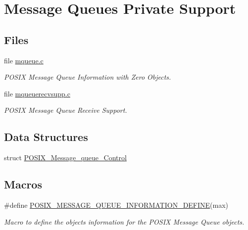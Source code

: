 \hypertarget{group__POSIX__MQUEUE__P}{}\section{Message Queues Private Support}
\label{group__POSIX__MQUEUE__P}
\subsection*{Files}
\begin{DoxyCompactItemize}
\item 
file \mbox{\hyperlink{mqueue_8c}{mqueue.\+c}}
\begin{DoxyCompactList}\small\item\em P\+O\+S\+IX Message Queue Information with Zero Objects. \end{DoxyCompactList}\item 
file \mbox{\hyperlink{mqueuerecvsupp_8c}{mqueuerecvsupp.\+c}}
\begin{DoxyCompactList}\small\item\em P\+O\+S\+IX Message Queue Receive Support. \end{DoxyCompactList}\end{DoxyCompactItemize}
\subsection*{Data Structures}
\begin{DoxyCompactItemize}
\item 
struct \mbox{\hyperlink{structPOSIX__Message__queue__Control}{P\+O\+S\+I\+X\+\_\+\+Message\+\_\+queue\+\_\+\+Control}}
\end{DoxyCompactItemize}
\subsection*{Macros}
\begin{DoxyCompactItemize}
\item 
\#define \mbox{\hyperlink{group__POSIX__MQUEUE__P_ga853d4305df0c19698101bde224806b25}{P\+O\+S\+I\+X\+\_\+\+M\+E\+S\+S\+A\+G\+E\+\_\+\+Q\+U\+E\+U\+E\+\_\+\+I\+N\+F\+O\+R\+M\+A\+T\+I\+O\+N\+\_\+\+D\+E\+F\+I\+NE}}(max)
\begin{DoxyCompactList}\small\item\em Macro to define the objects information for the P\+O\+S\+IX Message Queue objects. \end{DoxyCompactList}\end{DoxyCompactItemize}
